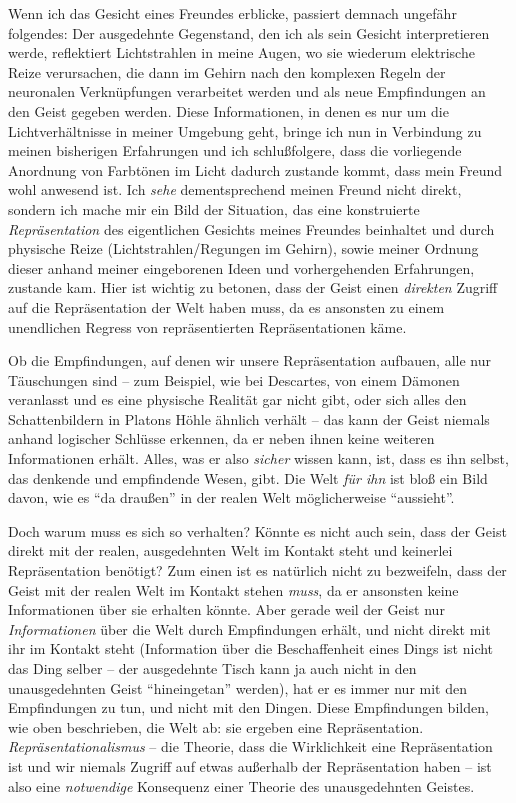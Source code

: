 \documentclass[a4paper, 12pt]{article}
\begin{document}
\begin{onehalfspace}
Wenn ich das Gesicht eines Freundes erblicke, passiert demnach ungefähr folgendes: Der ausgedehnte Gegenstand, den ich als sein Gesicht interpretieren werde, reflektiert Lichtstrahlen in meine Augen, wo sie wiederum elektrische Reize verursachen, die dann im Gehirn nach den komplexen Regeln der neuronalen Verknüpfungen verarbeitet werden und als neue Empfindungen an den Geist gegeben werden. Diese Informationen, in denen es nur um die Lichtverhältnisse in meiner Umgebung geht, bringe ich nun in Verbindung zu meinen bisherigen Erfahrungen und ich schlußfolgere, dass die vorliegende Anordnung von Farbtönen im Licht dadurch zustande kommt, dass mein Freund wohl anwesend ist. Ich \emph{sehe} dementsprechend meinen Freund nicht direkt, sondern ich mache mir ein Bild der Situation, das eine konstruierte \emph{Repräsentation} des eigentlichen Gesichts meines Freundes beinhaltet und durch physische Reize (Lichtstrahlen/Regungen im Gehirn), sowie meiner Ordnung dieser anhand meiner eingeborenen Ideen und vorhergehenden Erfahrungen, zustande kam. Hier ist wichtig zu betonen, dass der Geist einen \emph{direkten} Zugriff auf die Repräsentation der Welt haben muss, da es ansonsten zu einem unendlichen Regress von repräsentierten Repräsentationen käme.

Ob die Empfindungen, auf denen wir unsere Repräsentation aufbauen, alle nur Täu\-schungen sind -- zum Beispiel, wie bei Descartes, von einem Dämonen veranlasst und es eine physische Realität gar nicht gibt, oder sich alles den Schattenbildern in Platons Höhle ähnlich verhält -- das kann der Geist niemals anhand logischer Schlüsse erkennen, da er neben ihnen keine weiteren Informationen erhält. Alles, was er also \emph{sicher} wissen kann, ist, dass es ihn selbst, das denkende und empfindende Wesen, gibt. Die Welt \emph{für ihn} ist bloß ein Bild davon, wie es "`da draußen"' in der realen Welt möglicherweise "`aussieht"'.

Doch warum muss es sich so verhalten? Könnte es nicht auch sein, dass der Geist direkt mit der realen, ausgedehnten Welt im Kontakt steht und keinerlei Repräsentation benötigt? Zum einen ist es natürlich nicht zu bezweifeln, dass der Geist mit der realen Welt im Kontakt stehen \emph{muss}, da er ansonsten keine Informationen über sie erhalten könnte. Aber gerade weil der Geist nur \emph{Informationen} über die Welt durch Empfindungen erhält, und nicht direkt mit ihr im Kontakt steht (Information über die Beschaffenheit eines Dings ist nicht das Ding selber -- der ausgedehnte Tisch kann ja auch nicht in den unausgedehnten Geist "`hineingetan"' werden), hat er es immer nur mit den Empfindungen zu tun, und nicht mit den Dingen. Diese Empfindungen bilden, wie oben beschrieben, die Welt ab: sie ergeben eine Repräsentation. \emph{Repräsentationalismus} -- die Theorie, dass die Wirklichkeit eine Repräsentation ist und wir niemals Zugriff auf etwas außerhalb der Repräsentation haben -- ist also eine \emph{notwendige} Konsequenz einer Theorie des unausgedehnten Geistes.


\end{onehalfspace}
\end{document}
